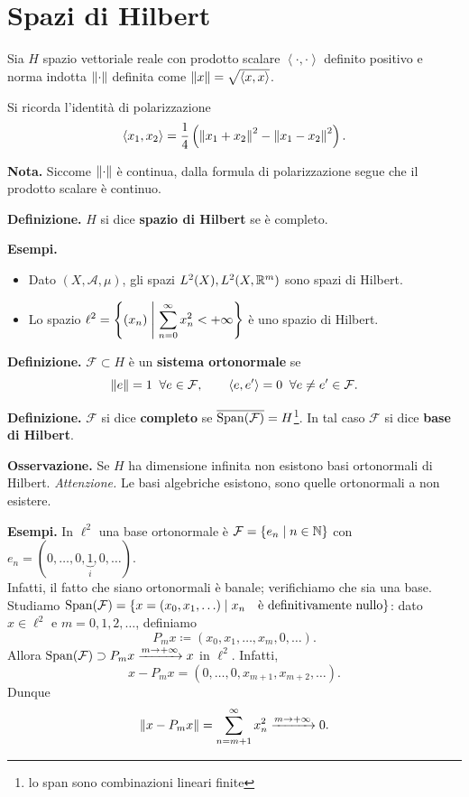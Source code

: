 \documentclass[a4paper, 12pt]{report}
\begin{document}
\chapter{Spazi di Hilbert}

Sia $H$ spazio vettoriale reale con prodotto scalare $\left<\cdot, \cdot \right>$ definito positivo e norma indotta $\left\lVert \cdot \right\rVert$ definita come $\left\lVert x \right\rVert = \sqrt{\left<x,x \right>}$.

Si ricorda l'identità di polarizzazione
%
$$
\left<x_1,x_2 \right> = \frac{1}{4} \left( \left\lVert x_1 + x_2 \right\rVert^2 - \left\lVert x_1 - x_2 \right\rVert^2 \right).
$$
%

\textbf{Nota.} Siccome $\left\lVert \cdot  \right\rVert$ è continua, dalla formula di polarizzazione segue che il prodotto scalare è continuo.

\textbf{Definizione.} $H$ si dice \textbf{spazio di Hilbert} se è completo.

\textbf{Esempi.} 
\begin{itemize}
\item Dato $(X, \mathcal{A}, \mu )$, gli spazi $L^2(X), L^2(X, \mathbb R^m)$ sono spazi di Hilbert.

\item Lo spazio $\displaystyle \ell^2 = \left\{ (x_n) \;\middle|\; \sum_{n=0}^{\infty} x_n^2 < +\infty  \right\}$ è uno spazio di Hilbert.

\end{itemize}

\textbf{Definizione.} $\mathcal{F} \subset H$ è un \textbf{sistema ortonormale} se
%
$$
\left\lVert e \right\rVert = 1 \;\; \forall e \in \mathcal{F}, \qquad  \left<e,e' \right> = 0 \;\; \forall e \neq e' \in \mathcal{F}.
$$
%


\textbf{Definizione.} $\mathcal{F}$ si dice \textbf{completo} se $\overline{\operatorname{Span}(\mathcal{F})} = H$\footnote{lo span sono combinazioni lineari finite}. In tal caso $\mathcal{F}$ si dice \textbf{base di Hilbert}.

\textbf{Osservazione.} Se $H$ ha dimensione infinita non esistono basi ortonormali di Hilbert. \textit{Attenzione.} Le basi algebriche esistono, sono quelle ortonormali a non esistere.

\textbf{Esempi.}
In $\ell^2$ una base ortonormale è $\mathcal{F} = \left\{ e_n \;\middle|\; n \in \mathbb N \right\}$ con $e_n = (0,\ldots ,0,\underbrace{1}_{i},0,\ldots )$. \\
Infatti, il fatto che siano ortonormali è banale; verifichiamo che sia una base. 
Studiamo $\operatorname{Span}(\mathcal{F}) = \left\{ x = (x_0,x_1,\ldots ) \;\middle|\; x_n \quad \text{è definitivamente nullo}  \right\}$: dato $x \in \ell^2$ e $m = 0,1,2,\ldots $, definiamo
%
$$
P_mx \coloneqq (x_0,x_1,\ldots , x_m,0,\ldots ).
$$
%
Allora $\operatorname{Span}(\mathcal{F}) \supset P_m x \xrightarrow{m \to +\infty} x$ in $\ell^2$.
Infatti, 
%
$$
x - P_m x = (0,\ldots ,0, x_{m+1}, x_{m+2},\ldots ).
$$
%
Dunque
%
$$
\left\lVert x - P_m x \right\rVert = \sum_{n = m+1}^{\infty} x_n^2 \xrightarrow{m \to +\infty} 0.
$$
%
\end{document}
